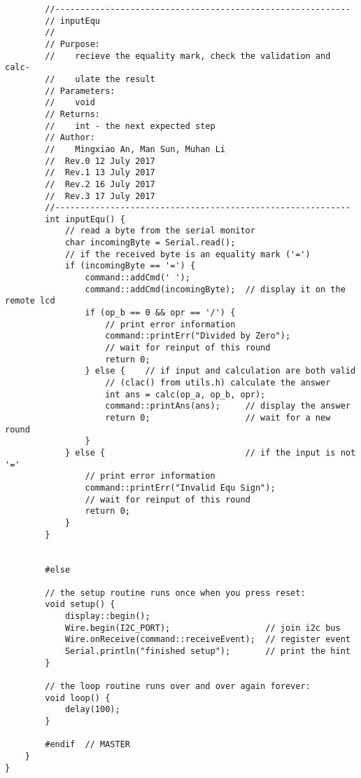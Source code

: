 \begin{verbatim}
        //-----------------------------------------------------------  
        // inputEqu 
        //  
        // Purpose:  
        //    recieve the equality mark, check the validation and calc-
        //    ulate the result
        // Parameters:  
        //    void 
        // Returns:  
        //    int - the next expected step   
        // Author:  
        //    Mingxiao An, Man Sun, Muhan Li
        //  Rev.0 12 July 2017
        //  Rev.1 13 July 2017
        //  Rev.2 16 July 2017
        //  Rev.3 17 July 2017
        //----------------------------------------------------------- 
        int inputEqu() {
            // read a byte from the serial monitor
            char incomingByte = Serial.read();
            // if the received byte is an equality mark ('=')
            if (incomingByte == '=') {
                command::addCmd(' ');
                command::addCmd(incomingByte);  // display it on the remote lcd
                if (op_b == 0 && opr == '/') {
                    // print error information
                    command::printErr("Divided by Zero");
                    // wait for reinput of this round
                    return 0;
                } else {    // if input and calculation are both valid
                    // (clac() from utils.h) calculate the answer
                    int ans = calc(op_a, op_b, opr);
                    command::printAns(ans);     // display the answer
                    return 0;                   // wait for a new round
                }
            } else {                            // if the input is not '='
                // print error information
                command::printErr("Invalid Equ Sign");
                // wait for reinput of this round
                return 0;
            }
        }
        

        #else

        // the setup routine runs once when you press reset:
        void setup() {
            display::begin();
            Wire.begin(I2C_PORT);                   // join i2c bus
            Wire.onReceive(command::receiveEvent);  // register event
            Serial.println("finished setup");       // print the hint   
        }

        // the loop routine runs over and over again forever:
        void loop() {
            delay(100);
        }

        #endif  // MASTER
    }
}

\end{verbatim}